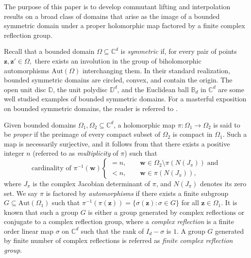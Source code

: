\documentclass[12pt,reqno]{amsart}
\theoremstyle{remark}
\theoremstyle{definition}
\def \z{\boldsymbol{z}}
\def \\theta{\boldsymbol{\theta}}
\def \\xi{\boldsymbol{\xi}}
\begin{document}
The purpose of this paper is to develop commutant lifting and interpolation results on a broad class of domains that arise as the image of a bounded symmetric domain under a proper holomorphic map factored by a finite complex reflection group. 

Recall that a bounded domain $\Omega\subseteq \mathbb C^d$ is {\it symmetric} if, for every pair of points $\z, \z'\in \Omega,$ there exists an involution in the group of biholomorphic automorphisms $\mathrm{Aut}(\Omega)$ interchanging them. 
In their standard realization, bounded symmetric domains are circled, convex, and contain the origin. The open unit disc $\mathbb D$, the unit polydisc $\mathbb D^d$, and the Euclidean ball $\mathbb B_d$ in $\mathbb C^d$ are some well studied examples of bounded symmetric domains. For a masterful exposition on bounded symmetric domains, the reader is referred to \cite{LO1977, AJ1995}.

Given bounded domains $\Omega_1,\Omega_2\subseteq \mathbb C^d$, a holomorphic map $\pi: \Omega_1\to \Omega_2$ is said to be {\it proper} if the preimage of every compact subset of $\Omega_2$ is compact in $\Omega_1.$ 
Such a map is necessarily surjective, and it follows from \cite[Section 1.2]{RD1982} that there exists a positive integer $n$ (referred to as {\it multiplicity} of $\pi$) such that
$$\text{cardinality of } \pi^{-1}(\boldsymbol w) \begin{cases}
    =n, \qquad \boldsymbol w\in \Omega_2\setminus\pi(N(J_\pi))\; \text{and}\\
     < n, \qquad \boldsymbol w\in \pi(N(J_\pi)),
\end{cases}$$
where $J_\pi$ is the complex Jacobian determinant of $\pi$, and  $N(J_\pi)$ denotes its zero set.
We say $\pi$ is factored by {\it automorphisms} if there exists a finite subgroup $G\subseteq \mathrm{Aut}(\Omega_1)$ such that $\pi^{-1}(\pi(\z))=\{\sigma(\z): \sigma\in G\}$ for all $\z\in \Omega_1.$ 
It is known that such a group $G$ is either a group generated by complex reflections or conjugate to a complex reflection group, where a {\it complex reflection} is a finite order linear map $\sigma$ on $\mathbb C^d$ such that the rank of $I_d-\sigma$ is $1$. A group $G$ generated by finite number of complex reflections is referred as {\it finite complex reflection group}. 



\end{document}
